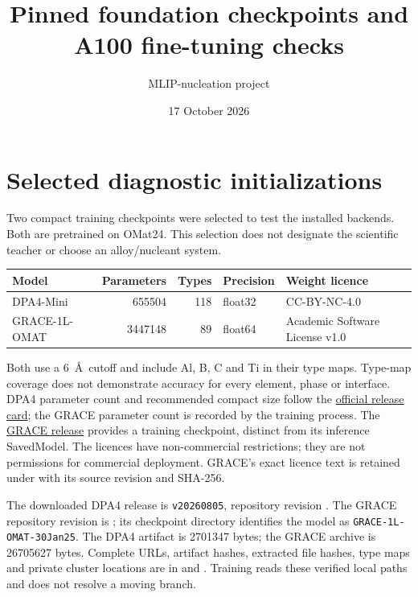 \documentclass[10pt,a4paper]{article}
\title{Pinned foundation checkpoints and A100 fine-tuning checks}
\author{MLIP-nucleation project}
\date{17 October 2026}
\begin{document}
\maketitle

\section{Selected diagnostic initializations}
Two compact training checkpoints were selected to test the installed backends.
Both are pretrained on OMat24. This selection does not designate the scientific
teacher or choose an alloy/nucleant system.

\begin{center}
\begin{tabularx}{\linewidth}{@{}lrrlX@{}}
\toprule
Model & Parameters & Types & Precision & Weight licence \\
\midrule
DPA4-Mini & 655504 & 118 & float32 & CC-BY-NC-4.0 \\
GRACE-1L-OMAT & 3447148 & 89 & float64 & Academic Software License v1.0 \\
\bottomrule
\end{tabularx}
\end{center}
Both use a 6~\AA\ cutoff and include Al, B, C and Ti in their type maps.
Type-map coverage does not demonstrate accuracy for every element, phase or
interface. DPA4 parameter count and recommended compact size follow the
\href{https://huggingface.co/deepmodelingcommunity/DPA4-OMat24}{official release card};
the GRACE parameter count is recorded by the training process.
The \href{https://huggingface.co/AMS-ICAMS-RUB/grace-foundation-models}{GRACE release}
provides a training checkpoint, distinct from its inference SavedModel.
The licences have non-commercial restrictions; they are not permissions for
commercial deployment. GRACE's exact licence text is retained under
 with its source revision and SHA-256.

The downloaded DPA4 release is \texttt{v20260805}, repository revision
.
The GRACE repository revision is
;
its checkpoint directory identifies the model as \texttt{GRACE-1L-OMAT-30Jan25}.
The DPA4 artifact is 2701347 bytes; the GRACE archive is 26705627 bytes.
Complete URLs, artifact hashes, extracted file hashes, type maps and private
cluster locations are in 
and .
Training reads these verified local paths and does not resolve a moving branch.
\end{document}
